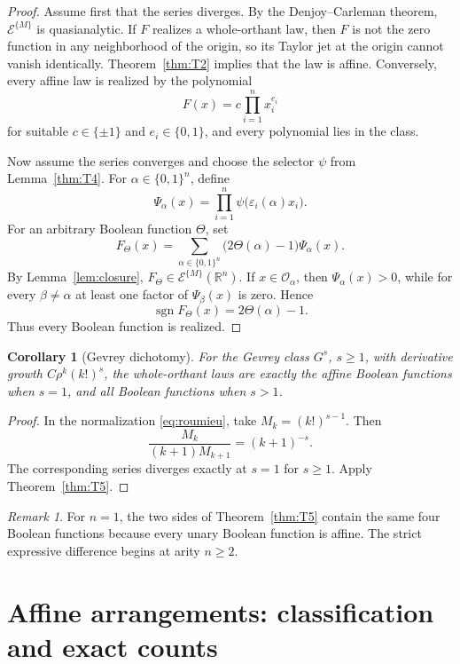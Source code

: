 \documentclass[11pt]{article}
\newtheorem{corollary}[theorem]{Corollary}
\theoremstyle{definition}
\theoremstyle{remark}
\newtheorem{remark}[theorem]{Remark}
\newcommand{\R}{\mathbb{R}}
\newcommand{\bits}{\{0,1\}}
\newcommand{\sign}{\operatorname{sgn}}
\newcommand{\eps}{\varepsilon}
\begin{document}
\begin{proof}
Assume first that the series diverges. By the Denjoy--Carleman theorem, $\mathcal{E}^{\{M\}}$ is quasianalytic. If $F$ realizes a whole-orthant law, then $F$ is not the zero function in any neighborhood of the origin, so its Taylor jet at the origin cannot vanish identically. Theorem~\ref{thm:T2} implies that the law is affine. Conversely, every affine law is realized by the polynomial
\[
 F(x)=c\prod_{i=1}^n x_i^{e_i}
\]
for suitable $c\in\{\pm1\}$ and $e_i\in\bits$, and every polynomial lies in the class.

Now assume the series converges and choose the selector $\psi$ from Lemma~\ref{thm:T4}. For $\alpha\in\bits^n$, define
\[
 \Psi_\alpha(x)
 =\prod_{i=1}^n\psi\bigl(\eps_i(\alpha)x_i\bigr).
\]
For an arbitrary Boolean function $\Theta$, set
\begin{equation}\label{eq:booleanselector}
 F_\Theta(x)
 =\sum_{\alpha\in\bits^n}
 \bigl(2\Theta(\alpha)-1\bigr)\Psi_\alpha(x).
\end{equation}
By Lemma~\ref{lem:closure}, $F_\Theta\in\mathcal{E}^{\{M\}}(\R^n)$. If $x\in\mathcal{O}_\alpha$, then $\Psi_\alpha(x)>0$, while for every $\beta\ne\alpha$ at least one factor of $\Psi_\beta(x)$ is zero. Hence
\[
 \sign F_\Theta(x)=2\Theta(\alpha)-1.
\]
Thus every Boolean function is realized.
\end{proof}

\begin{corollary}[Gevrey dichotomy]\label{cor:gevrey}
For the Gevrey class $G^s$, $s\ge1$, with derivative growth $C\rho^k(k!)^s$, the whole-orthant laws are exactly the affine Boolean functions when $s=1$, and all Boolean functions when $s>1$.
\end{corollary}

\begin{proof}
In the normalization \eqref{eq:roumieu}, take $M_k=(k!)^{s-1}$. Then
\[
 \frac{M_k}{(k+1)M_{k+1}}=(k+1)^{-s}.
\]
The corresponding series diverges exactly at $s=1$ for $s\ge1$. Apply Theorem~\ref{thm:T5}.
\end{proof}

\begin{remark}
For $n=1$, the two sides of Theorem~\ref{thm:T5} contain the same four Boolean functions because every unary Boolean function is affine. The strict expressive difference begins at arity $n\ge2$.
\end{remark}

\section{Affine arrangements: classification and exact counts}\label{sec:arrangements}
\end{document}
